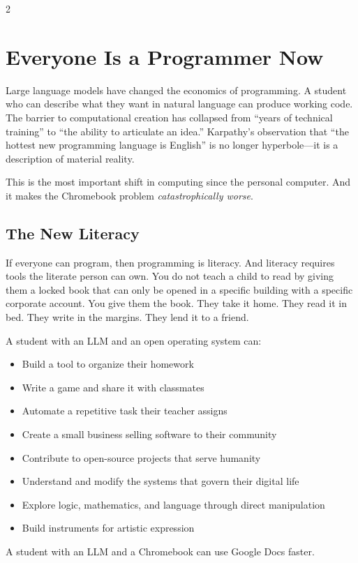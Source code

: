 \documentclass[11pt, a4paper]{article}
\begin{document}
\begin{multicols}{2}
\section{Everyone Is a Programmer Now}

Large language models have changed the economics of programming. A student who can describe what they want in natural language can produce working code. The barrier to computational creation has collapsed from ``years of technical training'' to ``the ability to articulate an idea.'' Karpathy's observation that ``the hottest new programming language is English'' is no longer hyperbole---it is a description of material reality.

This is the most important shift in computing since the personal computer. And it makes the Chromebook problem \emph{catastrophically worse}.

\subsection{The New Literacy}

If everyone can program, then programming is literacy. And literacy requires tools the literate person can own. You do not teach a child to read by giving them a locked book that can only be opened in a specific building with a specific corporate account. You give them the book. They take it home. They read it in bed. They write in the margins. They lend it to a friend.

A student with an LLM and an open operating system can:

\begin{itemize}
  \item Build a tool to organize their homework
  \item Write a game and share it with classmates
  \item Automate a repetitive task their teacher assigns
  \item Create a small business selling software to their community
  \item Contribute to open-source projects that serve humanity
  \item Understand and modify the systems that govern their digital life
  \item Explore logic, mathematics, and language through direct manipulation
  \item Build instruments for artistic expression
\end{itemize}

A student with an LLM and a Chromebook can use Google Docs faster.


\end{multicols}
\end{document}
